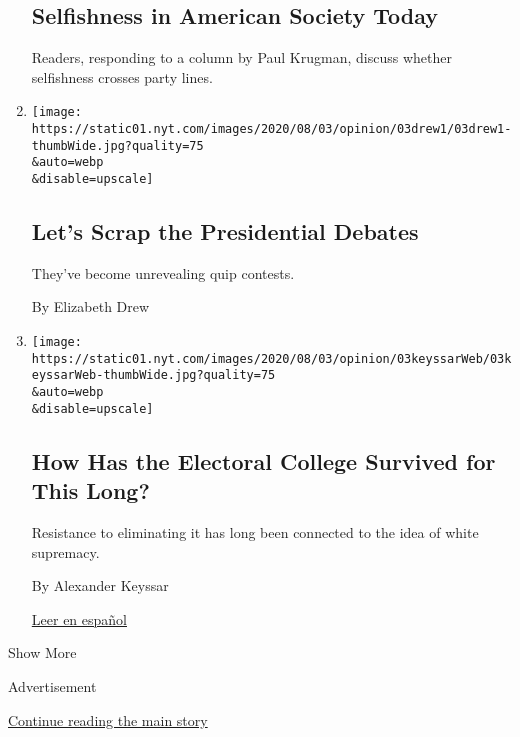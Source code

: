 \begin{enumerate}
  \hypertarget{selfishness-in-american-society-today}{%
  \subsection{Selfishness in American Society
  Today}\label{selfishness-in-american-society-today}}

  Readers, responding to a column by Paul Krugman, discuss whether
  selfishness crosses party lines.
\item
  \href{/2020/08/03/opinion/trump-biden-presidential-debates-2020.html}{}

  \texttt{[image: https://static01.nyt.com/images/2020/08/03/opinion/03drew1/03drew1-thumbWide.jpg?quality=75\\\&auto=webp\\\&disable=upscale]}

  \hypertarget{lets-scrap-the-presidential-debates}{%
  \subsection{Let's Scrap the Presidential
  Debates}\label{lets-scrap-the-presidential-debates}}

  They've become unrevealing quip contests.

  By Elizabeth Drew
\item
  \href{/2020/08/03/opinion/electoral-college-racism-white-supremacy.html}{}

  \texttt{[image: https://static01.nyt.com/images/2020/08/03/opinion/03keyssarWeb/03keyssarWeb-thumbWide.jpg?quality=75\\\&auto=webp\\\&disable=upscale]}

  \hypertarget{how-has-the-electoral-college-survived-for-this-long}{%
  \subsection{How Has the Electoral College Survived for This
  Long?}\label{how-has-the-electoral-college-survived-for-this-long}}

  Resistance to eliminating it has long been connected to the idea of
  white supremacy.

  By Alexander Keyssar

  \href{https://www.nytimes.com/es/2020/08/03/espanol/opinion/colegio-electoral-estados-unidos.html}{Leer
  en español}
\end{enumerate}

Show More

Advertisement

\protect\hyperlink{after-mid2}{Continue reading the main story}

